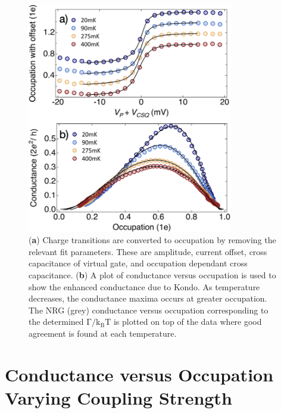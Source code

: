 \begin{figure}[!bht]
 \begin{center}
 \includegraphics[width=0.8\textwidth]{figures/ch3/crop_FiguresMaster.014.png}
 \caption[Method to determine occupation and plot conductance vs. occupation]{\label{fig:ch3/cond_vs_occ_gf} 
 (\textbf{a}) Charge transitions are converted to occupation by removing the relevant fit parameters. These are amplitude, current offset, cross capacitance of virtual gate, and occupation dependant cross capacitance. (\textbf{b}) A plot of conductance versus occupation is used to show the enhanced conductance due to Kondo. As temperature decreases, the conductance maxima occurs at greater occupation. The NRG (grey) conductance versus occupation corresponding to the determined $\mathrm{\Gamma/k_BT}$ is plotted on top of the data where good agreement is found at each temperature.}
 \end{center}
\end{figure}


\section{Conductance versus Occupation Varying Coupling Strength}


